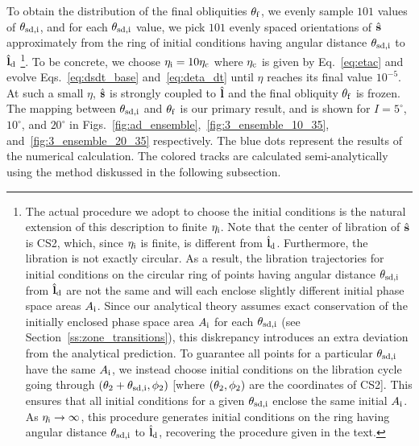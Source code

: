 To obtain the distribution of the final obliquities $\theta_{\rm f}$, we evenly
sample $101$ values of $\theta_{\rm sd, i}$, and for each $\theta_{\rm sd, i}$
value, we pick $101$ evenly spaced orientations of $\hat{\boldsymbol{\mathbf{s}}}$ approximately from
the ring of initial conditions having angular distance $\theta_{\rm sd, i}$ to
$\hat{\boldsymbol{\mathbf{l}}}_{\rm d}$%
%
\footnote{The actual procedure we adopt to choose the initial conditions is the
natural extension of this description to finite $\eta_{\rm i}$. Note that the
center of libration of $\hat{\boldsymbol{\mathbf{s}}}$ is CS2, which, since $\eta_{\rm i}$ is finite,
is different from $\hat{\boldsymbol{\mathbf{l}}}_{\rm d}$. Furthermore, the libration is not exactly
circular. As a result, the libration trajectories for initial conditions on the
circular ring of points having angular distance $\theta_{\rm sd, i}$ from
$\hat{\boldsymbol{\mathbf{l}}}_{\rm d}$ are not the same and will each enclose slightly different
initial phase space areas $A_{\rm i}$. Since our analytical theory assumes exact
conservation of the initially enclosed phase space area $A_{\rm i}$ for each
$\theta_{\rm sd, i}$ (see Section~\ref{ss:zone_transitions}), this diskrepancy
introduces an extra deviation from the analytical prediction. To guarantee all
points for a particular $\theta_{\rm sd, i}$ have the same $A_{\rm i}$, we
instead choose initial conditions on the libration cycle going through
$\left(\theta_2 + \theta_{\rm sd, i}, \phi_2\right)$ [where $\left(\theta_2, \phi_2\right)$ are
the coordinates of CS2]. This ensures that all initial conditions for a given
$\theta_{\rm sd, i}$ enclose the same initial $A_{\rm i}$. As $\eta_{\rm i} \to
\infty$, this procedure generates initial conditions on the ring having angular
distance $\theta_{\rm sd, i}$ to $\hat{\boldsymbol{\mathbf{l}}}_{\rm d}$, recovering the procedure
given in the text.}.
%
To be concrete, we choose $\eta_{\rm i} = 10\eta_{\rm c}$ where $\eta_{\rm c}$
is given by Eq.~\eqref{eq:etac} and evolve Eqs.~\eqref{eq:dsdt_base}
and~\eqref{eq:deta_dt} until $\eta$ reaches its final value $10^{-5}$. At such a
small $\eta$, $\hat{\boldsymbol{\mathbf{s}}}$ is strongly coupled to $\hat{\boldsymbol{\mathbf{l}}}$ and the final obliquity
$\theta_{\rm f}$ is frozen. The mapping between $\theta_{\rm sd, i}$ and
$\theta_{\rm f}$ is our primary result, and is shown for $I = 5^\circ$,
$10^\circ$, and $20^\circ$ in
Figs.~\ref{fig:ad_ensemble},~\ref{fig:3_ensemble_10_35},
and~\ref{fig:3_ensemble_20_35} respectively. The blue dots represent the results
of the numerical calculation. The colored tracks are calculated
semi-analytically using the method diskussed in the following subsection.

